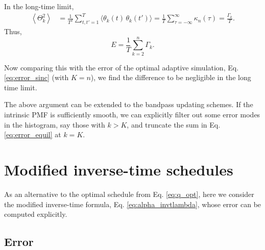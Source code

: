 \documentclass[reprint, floatfix]{revtex4-1}
\begin{document}
In the long-time limit,
\begin{align*}
  \left\langle
    \Theta_k^2
  \right\rangle
  &=
  \frac{1}{T^2}
  \sum_{ t, t' = 1 }^T
  \langle \theta_k(t) \, \theta_k(t') \rangle
  =
  \frac{1}{T}
  \sum_{\tau = -\infty}^\infty
    \kappa_n(\tau)
  =
  \frac{ \Gamma_k }{ T }
.
\end{align*}
%
Thus,
\begin{equation}
  E
  =
  \frac{ 1 } { T }
  \sum_{ k = 2 }^n \Gamma_k
  .
\label{eq:error_equil}
\end{equation}

Now comparing this with the error of
the optimal adaptive simulation,
Eq. \eqref{eq:error_sinc} (with $K = n$),
we find the difference to be negligible
in the long time limit.

The above argument can be extended
to the bandpass updating schemes.
%
If the intrinsic PMF is sufficiently smooth,
we can explicitly filter out some error modes
in the histogram,
say those with $k >  K$,
and truncate the sum in
Eq. \eqref{eq:error_equil} at $k = K$.






\section{\label{sec:invt_schedule}
Modified inverse-time schedules}



As an alternative to the
optimal schedule from Eq. \eqref{eq:q_opt},
here we consider the modified
inverse-time formula, Eq. \eqref{eq:alpha_invtlambda},
%
whose error can be computed explicitly.



\subsection{\label{sec:invt_error}
Error
}
\end{document}
